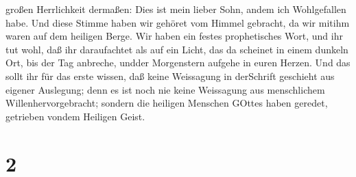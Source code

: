 großen Herrlichkeit dermaßen: Dies ist mein lieber Sohn, andem ich
Wohlgefallen habe.  Und diese Stimme haben wir gehöret vom
Himmel gebracht, da wir mitihm waren auf dem heiligen Berge.
 Wir haben ein festes prophetisches Wort, und ihr tut wohl,
daß ihr daraufachtet als auf ein Licht, das da scheinet in einem dunkeln
Ort, bis der Tag anbreche, undder Morgenstern aufgehe in euren Herzen.
 Und das sollt ihr für das erste wissen, daß keine
Weissagung in derSchrift geschieht aus eigener Auslegung; 
denn es ist noch nie keine Weissagung aus menschlichem
Willenhervorgebracht; sondern die heiligen Menschen GOttes haben
geredet, getrieben vondem Heiligen Geist.

\hypertarget{section-1}{%
\section{2}\label{section-1}}

